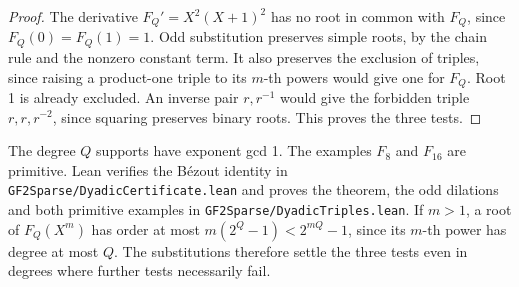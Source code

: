 \documentclass[11pt]{article}
\begin{document}
\begin{proof}
The derivative \(F_Q'=X^2(X+1)^2\) has no root in common with \(F_Q\),
since \(F_Q(0)=F_Q(1)=1\). Odd substitution preserves simple roots,
by the chain rule and the nonzero constant term. It also preserves the
exclusion of triples, since raising a product-one triple to its \(m\)-th
powers would give one for \(F_Q\). Root 1 is already excluded. An inverse
pair \(r,r^{-1}\) would give the forbidden triple \(r,r,r^{-2}\),
since squaring preserves binary roots. This proves the three tests.
\end{proof}
The degree \(Q\) supports have exponent gcd 1. The examples \(F_8\)
and \(F_{16}\) are primitive. Lean verifies the Bézout identity in
\texttt{GF2Sparse/DyadicCertificate.lean} and proves the theorem, the
odd dilations and both primitive examples in \texttt{GF2Sparse/DyadicTriples.lean}.
If \(m>1\), a root of \(F_Q(X^m)\)
has order at most \(m(2^Q-1)<2^{mQ}-1\), since its \(m\)-th power
has degree at most \(Q\). The substitutions therefore settle the three
tests even in degrees where further tests necessarily fail.
\end{document}
